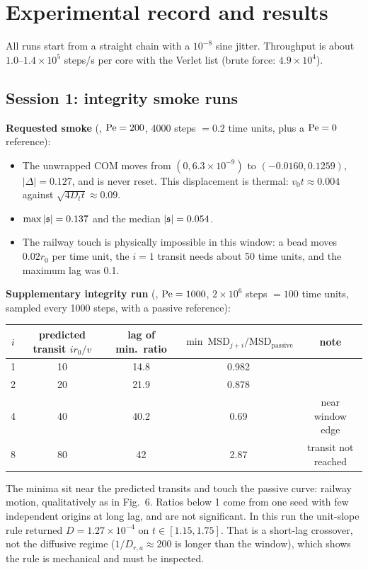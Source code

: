 \section{Experimental record and results}\label{sec:results}
All runs start from a straight chain with a $10^{-8}$ sine jitter. Throughput is about $1.0$--$1.4\times10^5$ steps/s per core with the Verlet list
(brute force: $4.9\times10^4$).

\subsection{Session 1: integrity smoke runs}
\textbf{Requested smoke} (, $\mathrm{Pe}=200$, 4000 steps $=0.2$ time units, plus a $\mathrm{Pe}=0$ reference):
\begin{itemize}
\item The unwrapped COM moves from $(0,6.3\times10^{-9})$ to $(-0.0160,0.1259)$, $|\Delta|=0.127$, and is never reset. This displacement is thermal: $v_0t\approx0.004$ against $\sqrt{4D_tt}\approx0.09$.
\item $\max|\mathfrak{s}|=0.137$ and the median $|\mathfrak{s}|=0.054$.
\item The railway touch is physically impossible in this window: a bead moves $0.02r_0$ per time unit, the $i=1$ transit needs about 50 time units, and the maximum lag was 0.1.
\end{itemize}
\textbf{Supplementary integrity run} (, $\mathrm{Pe}=1000$, $2\times10^6$ steps $=100$ time units, sampled every 1000 steps, with a passive reference):
\begin{center}\small
\begin{tabular}{ccccc}\toprule $i$ & predicted transit $ir_0/v$ & lag of min.\ ratio & $\min\ \mathrm{MSD}_{j+i}/\mathrm{MSD}_\mathrm{passive}$ & note\\ \midrule
1 & 10 & 14.8 & 0.982 & \\ 2 & 20 & 21.9 & 0.878 & \\ 4 & 40 & 40.2 & 0.69 & near window edge\\ 8 & 80 & 42 & 2.87 & transit not reached\\ \bottomrule\end{tabular}
\end{center}
The minima sit near the predicted transits and touch the passive curve: railway motion, qualitatively as in Fig.~6.
Ratios below 1 come from one seed with few independent origins at long lag, and are not significant. In this run the unit-slope rule returned
$D=1.27\times10^{-4}$ on $t\in[1.15,1.75]$. That is a short-lag crossover, not the diffusive regime ($1/D_{r,a}\approx200$ is longer than the window),
which shows the rule is mechanical and must be inspected.

